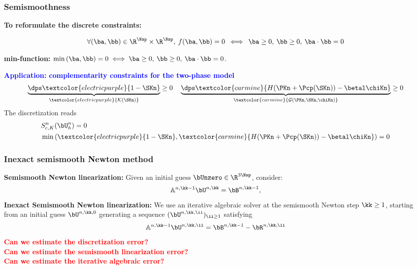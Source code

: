 \documentclass[10 pt]{beamer}
\begin{document}
\begin{frame}
\frametitle{Semismoothness}
\alert{\textbf{To reformulate the discrete constraints:}}
\vspace{0.2 cm}
\begin{definition}[C-function]
\begin{equation*}
\forall(\ba,\bb)\in {\R}^{\Nsp} \times \R^{\Nsp}, \: f(\ba,\bb)=0 \: \iff \:
\ba \geq0, \: \bb \geq0, \: \ba \cdot \bb=0
\end{equation*}
\end{definition}
\vspace{0.3 cm}
\textcolor{cadmiumgreen}{\textbf{min-function:}}  $\min\left(\ba,\bb\right)=0 \iff \ba \geq0, \: \bb \geq0, \: \ba \cdot \bb=0$.

\pause
\vspace{0.3 cm}

\textcolor{blue}{\textbf{Application: complementarity constraints for the two-phase model}}
\begin{equation*}
\underbrace{\dps \textcolor{electricpurple}{1-\SKn}}_{\textcolor{electricpurple}{\mathcal{K}(\SKn)}} \geq 0\quad  \underbrace{\dps \textcolor{carmine}{H(\PKn+\Pcp(\SKn))-\betal \chiKn}}_{\textcolor{carmine} {\mathcal{G}(\PKn,\SKn,\chiKn)}} \geq 0
\end{equation*}
The discretization reads
\pause
\begin{equation*}
\begin{split}
&S_{c,K}^n(\bU_h^n)=0\\
& \min\left(\textcolor{electricpurple}{1-\SKn},\textcolor{carmine}{H(\PKn+\Pcp(\SKn))-\betal \chiKn}\right)=0
\end{split}
\end{equation*}

\end{frame}
 \begin{frame}
 
 \frametitle{Inexact semismooth Newton method}

 \textcolor{cadmiumgreen}{\textbf{Semismooth Newton linearization:}} Given an initial guess $\bUnzero \in \R^{3 \Nsp}$, consider:
 \begin{equation*}
 \mathbb{A}^{n,\kk-1}\bU^{n,\kk}=\bB^{n,\kk-1},
 \end{equation*}
 \textcolor{cadmiumgreen}{\textbf{Inexact Semismooth Newton linearization:}}
We use an iterative algebraic solver at the semismooth Newton step $\kk \geq 1$, starting from an initial guess $\bU^{n,\kk,0}$ generating a sequence $(\bU^{n,\kk,\ii})_{\ii \geq 1}$ satisfying
 \begin{equation*}
 \mathbb{A}^{n,\kk-1}\bU^{n,\kk,\ii}=\bB^{n,\kk-1} - \bR^{n,\kk,\ii}
 \end{equation*}
 \pause
\textcolor{red}{\textbf{Can we estimate the discretization error?}} \\
\vspace{0.3 cm}
\textcolor{red}{\textbf{Can we estimate the semismooth linearization error?}} \\
\vspace{0.3 cm}
\textcolor{red}{\textbf{Can we estimate the iterative algebraic error?}}
 \end{frame}
\end{document}
